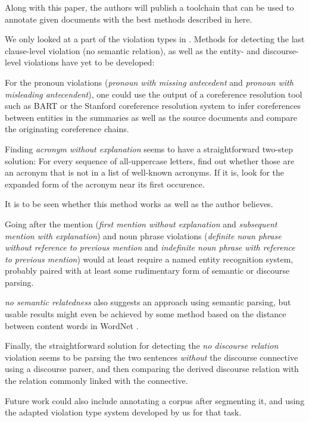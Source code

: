 \documentclass[a4paper,10pt]{scrartcl}
\theoremstyle{style}
\begin{document}
Along with this paper, the authors will publish a toolchain that can be used to annotate given documents with the best methods described in here.

We only looked at a part of the violation types in \cite{friedrichlqvsumm}. Methods for detecting the last clause-level violation (no semantic relation), as well as the entity- and discourse-level violations have yet to be developed:

For the pronoun violations (\textit{pronoun with missing antecedent} and \textit{pronoun with misleading antecendent}), one could use the output of a coreference resolution tool such as BART \citep{versley2008bart} or the Stanford coreference resolution system \citep{lee2011stanford} to infer coreferences between entities in the summaries as well as the source documents and compare the originating coreference chains.

Finding \textit{acronym without explanation} seems to have a straightforward two-step solution: For every sequence of all-uppercase letters, find out whether those are an acronym that is not in a list of well-known acronyms. If it is, look for the expanded form of the acronym near its first occurence.

It is to be seen whether this method works as well as the author believes.

Going after the mention (\textit{first mention without explanation} and \textit{subsequent mention with explanation}) and noun phrase violations (\textit{definite noun phrase without reference to previous mention} and \textit{indefinite noun phrase with reference to previous mention}) would at least require a named entity recognition system, probably paired with at least some rudimentary form of semantic or discourse parsing.

\textit{no semantic relatedness} also suggests an approach using semantic parsing, but usable results might even be achieved by some method based on the distance between content words in WordNet \citep{fellbaum2005wordnet}.

Finally, the straightforward solution for detecting the \textit{no discourse relation} violation seems to be parsing the two sentences \textit{without} the discourse connective using a discourse parser, and then comparing the derived discourse relation with the relation commonly linked with the connective.

Future work could also include annotating a corpus after segmenting it, and using the adapted violation type system developed by us for that task.
\end{document}
